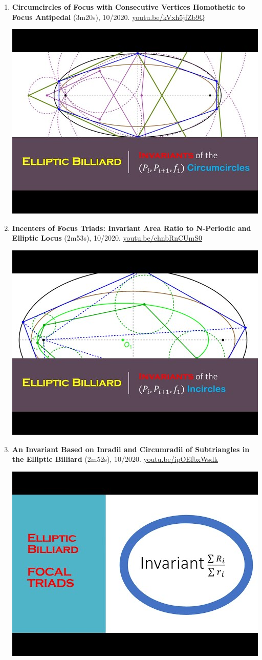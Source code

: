\documentclass[12pt]{article}
\begin{document}
\begin{enumerate}[resume]
% 
\item \textbf{Circumcircles of Focus with Consecutive Vertices Homothetic to Focus Antipedal} (3m20s), 10/2020. \href{https://youtu.be/kVxh5jfZb9Q}{\url{youtu.be/kVxh5jfZb9Q}}
\begin{center}\includegraphics[width=.5\textwidth]{pics/kVxh5jfZb9Q.jpg}\end{center}
% 
\item \textbf{Incenters of Focus Triads: Invariant Area Ratio to N-Periodic and Elliptic Locus} (2m53s), 10/2020. \href{https://youtu.be/ehnbRnCUmS0}{\url{youtu.be/ehnbRnCUmS0}}
\begin{center}\includegraphics[width=.5\textwidth]{pics/ehnbRnCUmS0.jpg}\end{center}
% 
\item \textbf{An Invariant Based on Inradii and Circumradii of Subtriangles in the Elliptic Billiard} (2m52s), 10/2020. \href{https://youtu.be/ipOEfbxWsdk}{\url{youtu.be/ipOEfbxWsdk}}
\begin{center}\includegraphics[width=.5\textwidth]{pics/ipOEfbxWsdk.jpg}\end{center}

\end{enumerate}
\end{document}
